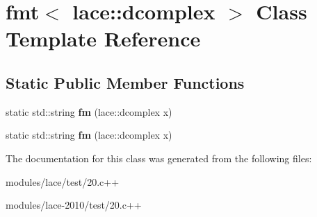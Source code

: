\hypertarget{classfmt_3_01lace_1_1dcomplex_01_4}{\section{fmt$<$ lace\-:\-:dcomplex $>$ Class Template Reference}
\label{classfmt_3_01lace_1_1dcomplex_01_4}
}
\subsection*{Static Public Member Functions}
\begin{DoxyCompactItemize}
\item 
\hypertarget{classfmt_3_01lace_1_1dcomplex_01_4_a8d63818e162b04110465c55837fd0e3e}{static std\-::string {\bfseries fm} (lace\-::dcomplex x)}\label{classfmt_3_01lace_1_1dcomplex_01_4_a8d63818e162b04110465c55837fd0e3e}

\item 
\hypertarget{classfmt_3_01lace_1_1dcomplex_01_4_a8d63818e162b04110465c55837fd0e3e}{static std\-::string {\bfseries fm} (lace\-::dcomplex x)}\label{classfmt_3_01lace_1_1dcomplex_01_4_a8d63818e162b04110465c55837fd0e3e}

\end{DoxyCompactItemize}


The documentation for this class was generated from the following files\-:\begin{DoxyCompactItemize}
\item 
modules/lace/test/20.\-c++\item 
modules/lace-\/2010/test/20.\-c++\end{DoxyCompactItemize}
